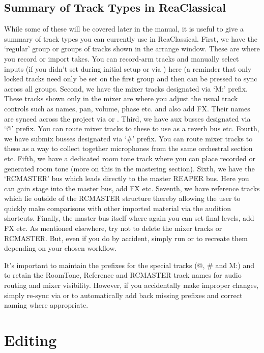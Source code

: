 \documentclass[10pt,american]{article}
\begin{document}
\subsection{Summary of Track Types in ReaClassical}

While some of these will be covered later in the manual, it is useful to give a
summary of track types you can currently use in ReaClassical. First, we have the
`regular' group or groups of tracks shown in the arrange window. These are where
you record or import takes. You can record-arm tracks and manually select inputs
(if you didn't set during initial setup or via ) here (a reminder
that only locked tracks need only be set on the first group and then 
can be pressed to sync across all groups. Second, we have the mixer tracks
designated via `M:' prefix. These tracks shown only in the mixer are where you
adjust the usual track controls such as names, pan, volume, phase etc. and also
add FX. Their names are synced across the project via  or .
Third, we have aux busses designated via `@' prefix. You can route mixer tracks
to these to use as a reverb bus etc. Fourth, we have submix busses designated
via `\#' prefix. You can route mixer tracks to these as a way to collect
together microphones from the same orchestral section etc. Fifth, we have a
dedicated room tone track where you can place recorded or generated room tone
(more on this in the mastering section). Sixth, we have the `RCMASTER' bus which
leads directly to the master REAPER bus. Here you can gain stage into the master
bus, add FX etc. Seventh, we have reference tracks which lie outside of the
RCMASTER structure thereby allowing the user to quickly make comparisons with
other imported material via the audition shortcuts. Finally, the master bus
itself where again you can set final levels, add FX etc. As mentioned elsewhere,
try not to delete the mixer tracks or RCMASTER. But, even if you do by accident,
simply run  or  to recreate them depending on your chosen
workflow.

It's important to maintain the prefixes for the special tracks (@, \# and M:)
and to retain the RoomTone, Reference and RCMASTER track names for audio routing
and mixer visibility. However, if you accidentally make improper changes, simply
re-sync via  or  to automatically add back missing prefixes
and correct naming where appropriate. 

\section{Editing}
\end{document}
